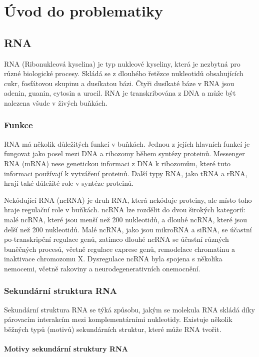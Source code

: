 
\chapter{Úvod do problematiky}

\section{RNA}

RNA (Ribonukleová kyselina) je typ nukleové kyseliny, která je nezbytná pro
různé biologické procesy. Skládá se z dlouhého řetězce nukleotidů obsahujících
cukr, fosfátovou skupinu a dusíkatou bázi. Čtyři dusíkaté báze v RNA jsou
adenin, guanin, cytosin a uracil. RNA je transkribována z DNA a může být
nalezena všude v živých buňkách.

\subsection{Funkce}

RNA má několik důležitých funkcí v buňkách. Jednou z jejích hlavních funkcí je
fungovat jako posel mezi DNA a ribozomy během syntézy proteinů. Messenger RNA
(mRNA) nese genetickou informaci z DNA k ribozomům, které tuto informaci
používají k vytváření proteinů. Další typy RNA, jako tRNA a rRNA, hrají také
důležité role v syntéze proteinů.

Nekódující RNA (ncRNA) je druh RNA, která nekóduje proteiny, ale místo toho
hraje regulační role v buňkách. ncRNA lze rozdělit do dvou širokých kategorií:
malé ncRNA, které jsou menší než 200 nukleotidů, a dlouhé ncRNA, které jsou
delší než 200 nukleotidů. Malé ncRNA, jako jsou mikroRNA a siRNA, se účastní
po-transkripční regulace genů, zatímco dlouhé ncRNA se účastní různých
buněčných procesů, včetně regulace exprese genů, remodelace chromatinu a
inaktivace chromozomu X. Dysregulace ncRNA byla spojena s několika nemocemi,
včetně rakoviny a neurodegenerativních onemocnění.

\subsection{Sekundární struktura RNA}

Sekundární struktura RNA se týká způsobu, jakým se molekula RNA skládá díky
párovacím interakcím mezi komplementárními nukleotidy. Existuje několik běžných
typů (motivů) sekundárních struktur, které může RNA tvořit.

\subsubsection{Motivy sekundární struktury RNA}

